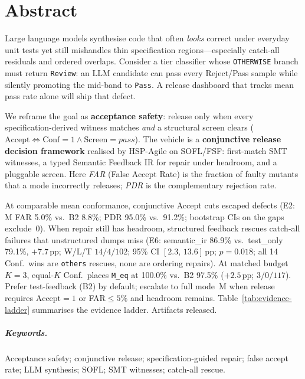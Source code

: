 \chapter*{Abstract}


Large language models synthesise code that often \emph{looks} correct under
everyday unit tests yet still mishandles thin specification regions---especially
catch-all residuals and ordered overlaps.
Consider a tier classifier whose \texttt{OTHERWISE} branch must return
\texttt{Review}: an LLM candidate can pass every Reject/Pass sample while
silently promoting the mid-band to \texttt{Pass}.
A release dashboard that tracks mean pass rate alone will ship that defect.

We reframe the goal as \textbf{acceptance safety}: release only when every
specification-derived witness matches \emph{and} a structural screen clears
($\mathrm{Accept}\Leftrightarrow\mathrm{Conf}{=}1\wedge\mathrm{Screen}{=}\mathit{pass}$).
The vehicle is a \textbf{conjunctive release decision framework} realised by
HSP-Agile on SOFL/FSF: first-match SMT witnesses, a typed Semantic Feedback IR
for repair under headroom, and a pluggable screen.
Here \emph{FAR} (False Accept Rate) is the fraction of faulty mutants that a
mode incorrectly releases; \emph{PDR} is the complementary rejection rate.

At comparable mean conformance, conjunctive Accept cuts escaped defects
(E2: M FAR 5.0\% vs.\ B2 8.8\%; PDR 95.0\% vs.\ 91.2\%; bootstrap CIs on the
gaps exclude~0).
When repair still has headroom, structured feedback rescues catch-all failures
that unstructured dumps miss (E6: semantic\_ir 86.9\% vs.\ test\_only 79.1\%,
${+}7.7$\,pp; W/L/T $14/4/102$; 95\% CI $[2.3,\,13.6]$\,pp; $p{=}0.018$;
all 14 Conf.\ wins are \texttt{others} rescues, none are ordering repairs).
At matched budget~$K{=}3$, equal-$K$ Conf.\ places \texttt{M\_eq} at 100.0\%
vs.\ B2 97.5\% (${+}2.5$\,pp; $3/0/117$).
Prefer test-feedback (B2) by default; escalate to full mode~M when release
requires $\mathrm{Accept}{=}1$ or FAR${\le}5\%$ and headroom remains.
Table~\ref{tab:evidence-ladder} summarises the evidence ladder.
Artifacts released.

\paragraph{Keywords.}
Acceptance safety; conjunctive release; specification-guided repair; false
accept rate; LLM synthesis; SOFL; SMT witnesses; catch-all rescue.
